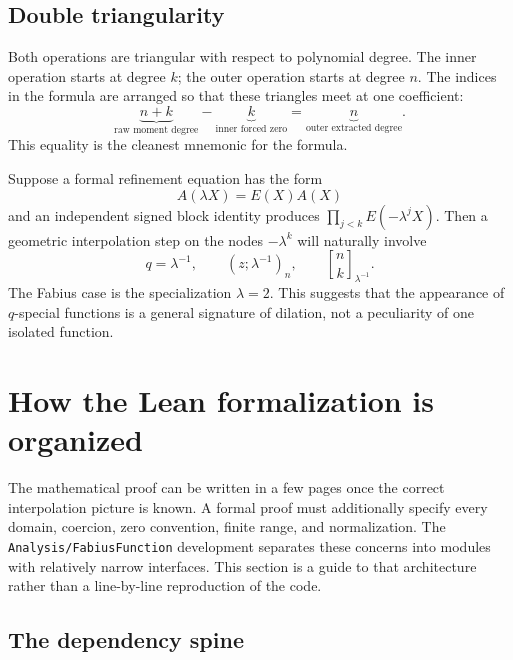 \documentclass[11pt,oneside]{article}
\theoremstyle{definition}
\theoremstyle{remark}
\newcommand{\qpoch}[3]{\left(#1;#2\right)_{#3}}
\newcommand{\qbinom}[3]{{\genfrac{[}{]}{0pt}{}{#1}{#2}}_{#3}}
\begin{document}
\subsection{Double triangularity}

Both operations are triangular with respect to polynomial degree.  The inner
operation starts at degree $k$; the outer operation starts at degree $n$.
The indices in the formula are arranged so that these triangles meet at one
coefficient:
\[
 \underbrace{n+k}_{\text{raw moment degree}}
 -\underbrace{k}_{\text{inner forced zero}}
 =\underbrace{n}_{\text{outer extracted degree}}.
\]
This equality is the cleanest mnemonic for the formula.

\begin{greenbox}
Suppose a formal refinement equation has the form
\[
 A(\lambda X)=E(X)A(X)
\]
and an independent signed block identity produces
$\prod_{j<k}E(-\lambda^jX)$.  Then a geometric interpolation step on the
nodes $-\lambda^k$ will naturally involve
\[
 q=\lambda^{-1},\qquad
 \qpoch{z}{\lambda^{-1}}{n},\qquad
 \qbinom{n}{k}{\lambda^{-1}}.
\]
The Fabius case is the specialization $\lambda=2$.  This suggests that the
appearance of $q$-special functions is a general signature of dilation, not
a peculiarity of one isolated function.
\end{greenbox}

\section{How the Lean formalization is organized}
\label{sec:leanarchitecture}

The mathematical proof can be written in a few pages once the correct
interpolation picture is known.  A formal proof must additionally specify
every domain, coercion, zero convention, finite range, and normalization.
The \texttt{Analysis/FabiusFunction} development separates these concerns
into modules with relatively narrow interfaces.  This section is a guide to
that architecture rather than a line-by-line reproduction of the code.

\subsection{The dependency spine}
\end{document}
